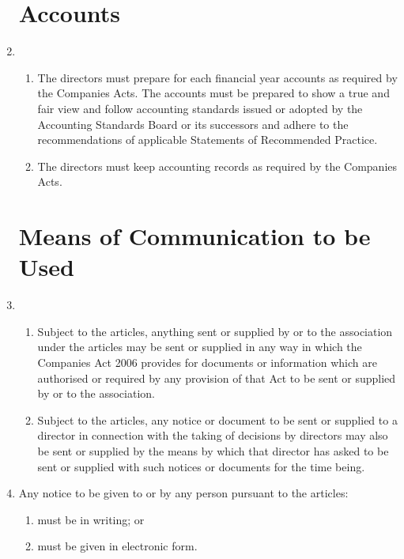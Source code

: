 \begin{enumerate}
\section{Accounts}

\item
  \begin{enumerate}
  \item
    The directors must prepare for each financial year accounts as
    required by the Companies Acts. The accounts must be prepared to
    show a true and fair view and follow accounting standards issued or
    adopted by the Accounting Standards Board or its successors and
    adhere to the recommendations of applicable Statements of
    Recommended Practice.
  \item
    The directors must keep accounting records as required by the
    Companies Acts.
  \end{enumerate}


\section{Means of Communication to be Used}

\item
  \begin{enumerate}
  \item
    Subject to the articles, anything sent or supplied by or to the
    association under the articles may be sent or supplied in any way in
    which the Companies Act 2006 provides for documents or information
    which are authorised or required by any provision of that Act to be
    sent or supplied by or to the association.
  \item
    Subject to the articles, any notice or document to be sent or
    supplied to a director in connection with the taking of decisions
    by directors may also be sent or supplied by the means by which
    that director has asked to be sent or supplied with such notices or
    documents for the time being.
  \end{enumerate}
\item
  Any notice to be given to or by any person pursuant to the
  articles:
  \begin{enumerate}
  \item
    must be in writing; or
  \item
    must be given in electronic form.
  \end{enumerate}


\end{enumerate}
